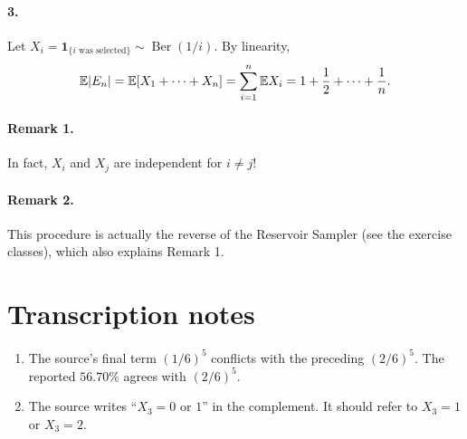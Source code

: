 \documentclass[11pt,a4paper]{article}
\begin{document}
\paragraph{3.} Let $X_i=\mathbf1_{\{i\text{ was selected}\}}\sim\operatorname{Ber}(1/i)$.
By linearity,
\[
\mathbb {E}|E_n|=\mathbb {E}[X_1+\cdots+X_n]=\sum_{i=1}^n\mathbb {E} X_i
=1+\frac12+\cdots+\frac1n.
\]
\paragraph{Remark 1.} In fact, $X_i$ and $X_j$ are independent for $i\ne j$!
\paragraph{Remark 2.} This procedure is actually the reverse of the Reservoir Sampler (see the exercise classes), which also explains Remark 1.

\section*{Transcription notes}
\begin{enumerate}
\item The source's final term $(1/6)^5$ conflicts with the preceding $(2/6)^5$. The reported $56.70\%$ agrees with $(2/6)^5$.
\item The source writes ``$X_3=0$ or $1$'' in the complement. It should refer to $X_3=1$ or $X_3=2$.
\end{enumerate}
\end{document}
